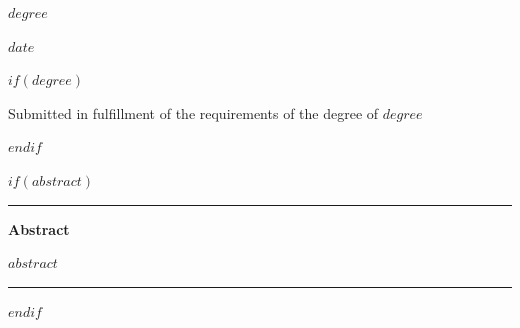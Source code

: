 {{\bfseries\Large\textit{$degree$} \par}
\vspace{3ex}

{\bfseries\large $date$ \par}
\vspace{3ex}

\vspace{10ex}
$if(degree)$
{\small Submitted in fulfillment of the requirements
of the degree of $degree$ \par}
$endif$
\pagebreak

$if(abstract)$
\vspace*{\fill} %
    \hspace*{\fill}\rule{0.6\textwidth}{0.4pt}\hspace*{\fill} 
    \par\vspace{2em} %
    {\Large\bfseries Abstract \par} %
    \vspace{1em} %
    \raggedright %
    $abstract$ \par
    \vspace{2em} %
    \hspace*{\fill}\rule{0.6\textwidth}{0.4pt}\hspace*{\fill}
\vspace*{\fill} %
}
$endif$